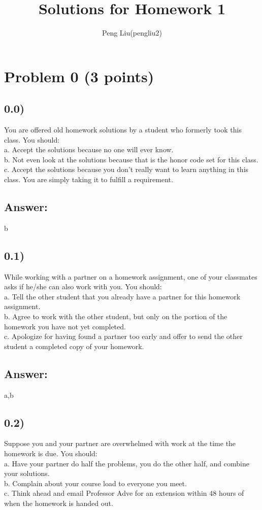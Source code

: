 \documentclass[letter,11pt,leqno]{article}
\author{Peng Liu(pengliu2)}
\title{Solutions for Homework 1}
\begin{document}
\maketitle
\section*{Problem 0 (3 points)}
\subsection*{0.0)} You are offered old homework solutions by a student who formerly took this class. You should:\\
a. Accept the solutions because no one will ever know.\\
b. Not even look at the solutions because that is the honor code set for this class.\\
c. Accept the solutions because you don’t really want to learn anything in this class. You are simply taking it to fulfill a requirement.

\subsection*{Answer:} b

\subsection*{0.1)} While working with a partner on a homework assignment, one of your classmates asks if he/she can also work with you. You should:\\
a. Tell the other student that you already have a partner for this homework assignment.\\
b. Agree to work with the other student, but only on the portion of the homework you have not yet completed.\\
c. Apologize for having found a partner too early and offer to send the other student a completed copy of your homework.

\subsection*{Answer:} a,b

\subsection*{0.2)} Suppose you and your partner are overwhelmed with work at the time the homework is due. You should:\\
a. Have your partner do half the problems, you do the other half, and combine your solutions.\\
b. Complain about your course load to everyone you meet.\\
c. Think ahead and email Professor Adve for an extension within 48 hours of when the homework is handed out.
\end{document}
